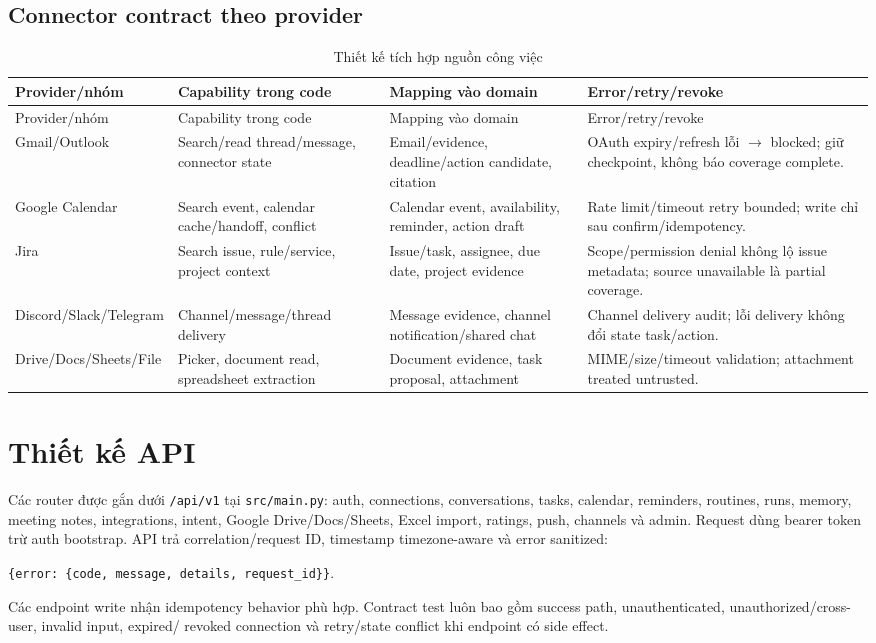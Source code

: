 \documentclass[12pt,a4paper]{article}
\begin{document}
\subsection{Connector contract theo provider}
\begin{longtable}{p{2.7cm}p{3.4cm}p{4.2cm}p{3.9cm}}
\caption{Thiết kế tích hợp nguồn công việc}\label{tab:sdd-provider-contract}\\
\toprule Provider/nhóm & Capability trong code & Mapping vào domain & Error/retry/revoke \\ \midrule
\endfirsthead
\toprule Provider/nhóm & Capability trong code & Mapping vào domain & Error/retry/revoke \\ \midrule
\endhead
Gmail/Outlook & Search/read thread/message, connector state & Email/evidence, deadline/action candidate, citation & OAuth expiry/refresh lỗi $\rightarrow$ blocked; giữ checkpoint, không báo coverage complete. \\
Google Calendar & Search event, calendar cache/handoff, conflict & Calendar event, availability, reminder, action draft & Rate limit/timeout retry bounded; write chỉ sau confirm/idempotency. \\
Jira & Search issue, rule/service, project context & Issue/task, assignee, due date, project evidence & Scope/permission denial không lộ issue metadata; source unavailable là partial coverage. \\
Discord/Slack/Telegram & Channel/message/thread delivery & Message evidence, channel notification/shared chat & Channel delivery audit; lỗi delivery không đổi state task/action. \\
Drive/Docs/Sheets/File & Picker, document read, spreadsheet extraction & Document evidence, task proposal, attachment & MIME/size/timeout validation; attachment treated untrusted. \\
\bottomrule
\end{longtable}

\section{Thiết kế API}
Các router được gắn dưới \texttt{/api/v1} tại \texttt{src/main.py}: auth,
connections, conversations, tasks, calendar, reminders, routines, runs, memory,
meeting notes, integrations, intent, Google Drive/Docs/Sheets, Excel import,
ratings, push, channels và admin. Request dùng bearer token trừ auth bootstrap.
API trả correlation/request ID, timestamp timezone-aware và error sanitized:
\begin{center}
\texttt{\{error: \{code, message, details, request\_id\}\}}.
\end{center}
Các endpoint write nhận idempotency behavior phù hợp. Contract test luôn bao gồm
success path, unauthenticated, unauthorized/cross-user, invalid input, expired/
revoked connection và retry/state conflict khi endpoint có side effect.
\end{document}

